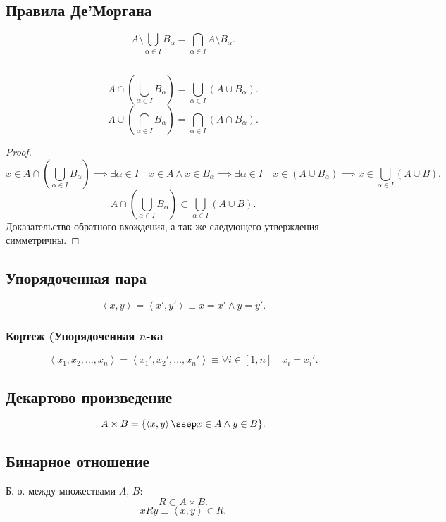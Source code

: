 \documentclass[11pt, oneside]{article}   	%
\begin{document}
    \subsection{Правила Де'Моргана}
        \[ A\setminus\bigcup\limits_{\alpha \in I}B_{\alpha} = \bigcap\limits_{\alpha \in I}A\setminus B_{\alpha}  .\]
    \subsection{}
        \begin{theorem}
            \[ A\cap\left( \bigcup\limits_{\alpha \in I}B_{\alpha} \right)=\bigcup\limits_{\alpha \in I}\left( A\cup B_{\alpha} \right)   .\] 
            \[ A\cup\left( \bigcap\limits_{\alpha \in I}B_{\alpha} \right) = \bigcap\limits_{\alpha \in I}\left( A\cap B_{\alpha} \right)   .\] 
            \begin{proof}
                \[x \in A\cap\left( \bigcup\limits_{\alpha \in I}B_{\alpha} \right) \implies \exists{\alpha \in I}\quad x \in A\land x \in B_{\alpha} \implies \exists{\alpha \in I}\quad x \in \left( A\cup B_{\alpha} \right) \implies x \in \bigcup\limits_{\alpha \in I}\left( A\cup B \right) .\]
                \[ A\cap\left( \bigcup\limits_{\alpha \in I}B_{\alpha} \right) \subset \bigcup\limits_{\alpha \in I}\left( A\cup B \right) .\] 
                Доказательство обратного вхождения, а так-же следующего утверждения симметричны. 
            \end{proof}
        \end{theorem}
    \subsection{Упорядоченная пара}
        \[ \left<x, y\right> = \left<x', y'\right> \equiv x=x'\land y=y' .\]
        \subsubsection{Кортеж (Упорядоченная $n$-ка}
        \[ \left<x_1, x_2, \ldots, x_n\right> = \left<x_1', x_2', \ldots, x_n'\right> \equiv \forall{i \in [1, n]}\quad x_i = x_i' .\] 
    \subsection{Декартово произведение}
        \[ A\times B = \{\left<x, y\right> \ssep x \in A\land y \in B\}  .\] 
    \subsection{Бинарное отношение}
        Б. о. между множествами $A$,  $B$:
         \[ R \subset A\times B .\]
         \[ xRy \equiv \left<x, y\right> \in R .\]
\end{document}
